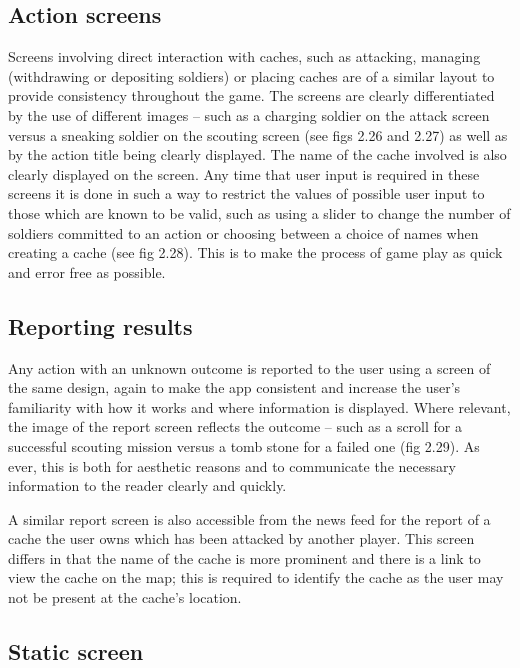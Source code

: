 \subsection{Action screens}

Screens involving direct interaction with caches, such as attacking, managing (withdrawing or depositing soldiers) or placing caches are of a similar layout to provide consistency throughout the game. The screens are clearly differentiated by the use of different images – such as a charging soldier on the attack screen versus a sneaking soldier on the scouting screen (see figs 2.26 and 2.27) as well as by the action title being clearly displayed. The name of the cache involved is also clearly displayed on the screen. Any time that user input is required in these screens it is done in such a way to restrict the values of possible user input to those which are known to be valid, such as using a slider to change the number of soldiers committed to an action or choosing between a choice of names when creating a cache (see fig 2.28). This is to make the process of game play as quick and error free as possible.

\subsection{Reporting results}

Any action with an unknown outcome is reported to the user using a screen of the same design, again to make the app consistent and increase the user’s familiarity with how it works and where information is displayed. Where relevant, the image of the report screen reflects the outcome – such as a scroll for a successful scouting mission versus a tomb stone for a failed one (fig 2.29). As ever, this is both for aesthetic reasons and to communicate the necessary information to the reader clearly and quickly.

A similar report screen is also accessible from the news feed for the report of a cache the user owns which has been attacked by another player. This screen differs in that the name of the cache is more prominent and there is a link to view the cache on the map; this is required to identify the cache as the user may not be present at the cache’s location.

\subsection{Static screen}

